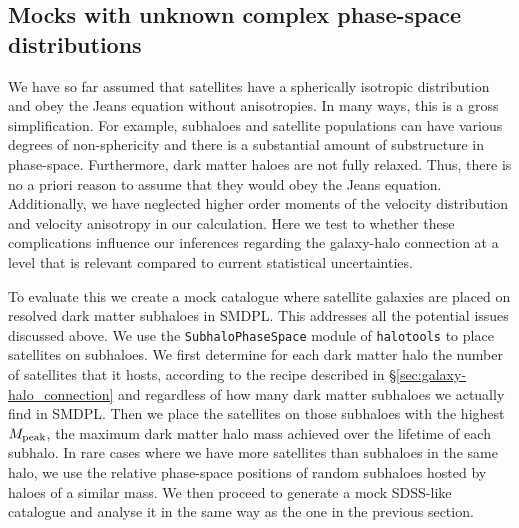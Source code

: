 \documentclass[fleqn,usenatbib,useAMS]{mnras}
\begin{document}
	\subsection{Mocks with unknown complex phase-space distributions}
	\label{subsec:mocks_complex}
	
	We have so far assumed that satellites have a spherically isotropic distribution and obey the Jeans equation without anisotropies. In many ways, this is a gross simplification. For example, subhaloes and satellite populations can have various degrees of non-sphericity and there is a substantial amount of substructure in phase-space. Furthermore, dark matter haloes are not fully relaxed.  Thus, there is no a priori reason to assume that they would obey the Jeans equation. Additionally, we have neglected higher order moments of the velocity distribution and velocity anisotropy in our calculation. Here we test to whether these complications influence our inferences regarding the galaxy-halo connection at a level that is relevant compared to current statistical uncertainties.
	
	To evaluate this we create a mock catalogue where satellite galaxies are placed on resolved dark matter subhaloes in SMDPL. This addresses all the potential issues discussed above. We use the \texttt{SubhaloPhaseSpace} module of \texttt{halotools} to place satellites on subhaloes. We first determine for each dark matter halo the number of satellites that it hosts, according to the recipe described in \S\ref{sec:galaxy-halo_connection} and regardless of how many dark matter subhaloes we actually find in SMDPL. Then we place the satellites on those subhaloes with the highest $M_{\rm peak}$, the maximum dark matter halo mass achieved over the lifetime of each subhalo. In rare cases where we have more satellites than subhaloes in the same halo, we use the relative phase-space positions of random subhaloes hosted by haloes of a similar mass. We then proceed to generate a mock SDSS-like catalogue and analyse it in the same way as the one in the previous section.
	
\end{document}
